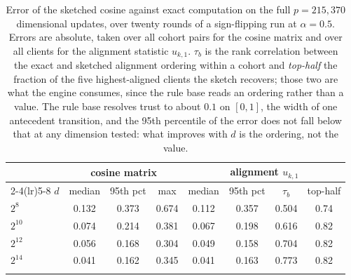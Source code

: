 \begin{table}[t]
\centering
\caption{Error of the sketched cosine against exact computation on the full $p=215{,}370$ dimensional updates, over twenty rounds of a sign-flipping run at $\alpha=0.5$. Errors are absolute, taken over all cohort pairs for the cosine matrix and over all clients for the alignment statistic $u_{k,1}$. $\tau_b$ is the rank correlation between the exact and sketched alignment ordering within a cohort and \emph{top-half} the fraction of the five highest-aligned clients the sketch recovers; those two are what the engine consumes, since the rule base reads an ordering rather than a value. The rule base resolves trust to about $0.1$ on $[0,1]$, the width of one antecedent transition, and the 95th percentile of the error does not fall below that at any dimension tested: what improves with $d$ is the ordering, not the value.}
\label{tab:sketch}
\setlength{\tabcolsep}{4.0pt}
\footnotesize
\begin{tabular}{@{}lccccccc@{}}
\toprule
& \multicolumn{3}{c}{cosine matrix} & \multicolumn{4}{c}{alignment $u_{k,1}$}\\
\cmidrule(lr){2-4}\cmidrule(lr){5-8}
$d$ & median & 95th pct & max & median & 95th pct & $\tau_b$ & top-half\\
\midrule
$2^{8}$ & 0.132 & 0.373 & 0.674 & 0.112 & 0.357 & 0.504 & 0.74\\
$2^{10}$ & 0.074 & 0.214 & 0.381 & 0.067 & 0.198 & 0.616 & 0.82\\
$2^{12}$ & 0.056 & 0.168 & 0.304 & 0.049 & 0.158 & 0.704 & 0.82\\
$2^{14}$ & 0.041 & 0.162 & 0.345 & 0.041 & 0.163 & 0.773 & 0.82\\
\botrule
\end{tabular}
\end{table}
